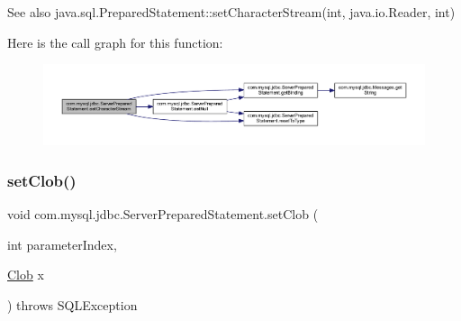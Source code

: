 \begin{DoxySeeAlso}{See also}
java.\+sql.\+Prepared\+Statement\+::set\+Character\+Stream(int, java.\+io.\+Reader, int) 
\end{DoxySeeAlso}
Here is the call graph for this function\+:
\nopagebreak
\begin{figure}[H]
\begin{center}
\leavevmode
\includegraphics[width=350pt]{classcom_1_1mysql_1_1jdbc_1_1_server_prepared_statement_af6753dd61ca0bdea3e4af6cf607a171d_cgraph}
\end{center}
\end{figure}
\mbox{\label{classcom_1_1mysql_1_1jdbc_1_1_server_prepared_statement_a2f04b85d3ca2ff2d58eb7eb6f45d4381}} 
\subsubsection{\texorpdfstring{set\+Clob()}{setClob()}}
{\footnotesize\ttfamily void com.\+mysql.\+jdbc.\+Server\+Prepared\+Statement.\+set\+Clob (\begin{DoxyParamCaption}\item[{int}]{parameter\+Index,  }\item[{\mbox{\hyperlink{classcom_1_1mysql_1_1jdbc_1_1_clob}{Clob}}}]{x }\end{DoxyParamCaption}) throws S\+Q\+L\+Exception}

